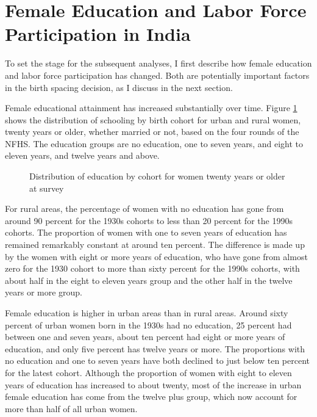 \documentclass[12pt,letterpaper]{article}
\begin{document}

\section{Female Education and Labor Force Participation in India}

To set the stage for the subsequent analyses, I first describe how female education
and labor force participation has changed.
Both are potentially important factors in the birth spacing decision, as I discuss
in the next section.

Female educational attainment has increased substantially over time.
Figure \ref{fig:education_over_time} shows the distribution of schooling by birth 
cohort for urban and rural women, 
twenty years or older, whether married or not, based on the four rounds of the NFHS.
The education groups are no education, one to seven years, and eight to eleven years,
and twelve years and above.

\begin{figure}[htpb]
\centering
{} 
\caption{Distribution of education by cohort for women twenty years or older at survey}
\label{fig:education_over_time}
\end{figure}


For rural areas, the percentage of women with no education has gone from around 90 percent
for the 1930s cohorts to less than 20 percent for the 1990s cohorts. 
The proportion of women with one to seven years of education has remained remarkably
constant at around ten percent.
The difference is made up by the women with eight or more years of education, who have
gone from almost zero for the 1930 cohort to more than sixty percent for the 1990s cohorts,
with about half in the eight to eleven years group and 
the other half in the twelve years or more group.

Female education is higher in urban areas than in rural areas.
Around sixty percent of urban women born in the 1930s had no education, 25 percent had
between one and seven years, about ten percent had eight or more years of education, and 
only five percent has twelve years or more.
The proportions with no education and one to seven years have both declined to just below 
ten percent for the latest cohort.
Although the proportion of women with eight to eleven years of education has increased
to about twenty, most of the increase in urban female education has come from the 
twelve plus group, which now account for more than half of all urban women.
\end{document}
